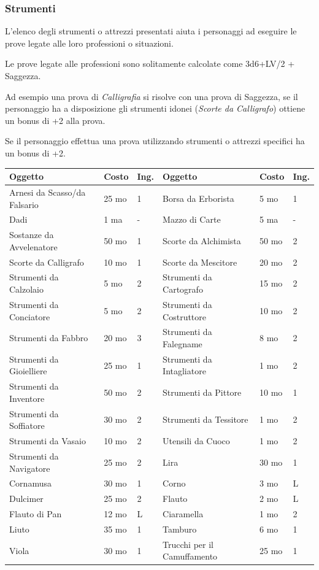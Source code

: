 \begin{multicols}{2}

\subsubsection{Strumenti}

L'elenco degli strumenti o attrezzi presentati aiuta i personaggi ad eseguire le prove legate alle loro professioni o situazioni.

Le prove legate alle professioni sono solitamente calcolate come 3d6+LV/2 + Saggezza.

Ad esempio una prova di \emph{Calligrafia} si risolve con una prova di Saggezza, se il personaggio ha a disposizione gli strumenti idonei (\emph{Scorte da Calligrafo}) ottiene un bonus di +2 alla prova.

Se il personaggio effettua una prova utilizzando strumenti o attrezzi specifici ha un bonus di +2.

\end{multicols}

\medskip

\noindent\begin{tabularx}{\linewidth}{llX|llX}
	\toprule
\textbf{Oggetto}&\textbf{Costo}&\textbf{Ing.}&\textbf{Oggetto}&\textbf{Costo}&\textbf{Ing.}\\
\toprule
Arnesi da Scasso/da Falsario&25 mo&1&Borsa da Erborista&5 mo&1\\
Dadi&1 ma&-&Mazzo di Carte&5 ma&-\\
Sostanze da Avvelenatore&50 mo&1&Scorte da Alchimista&50 mo&2\\
Scorte da Calligrafo&10 mo&1&Scorte da Mescitore&20 mo&2\\
Strumenti da Calzolaio&5 mo&2&Strumenti da Cartografo&15 mo&2\\
Strumenti da Conciatore&5 mo&2&Strumenti da Costruttore&10 mo&2\\
Strumenti da Fabbro&20 mo&3&Strumenti da Falegname&8 mo&2\\
Strumenti da Gioielliere&25 mo&1&Strumenti da Intagliatore&1 mo&2\\
Strumenti da Inventore&50 mo&2&Strumenti da Pittore&10 mo&1\\
Strumenti da Soffiatore&30 mo&2&Strumenti da Tessitore&1 mo&2\\
Strumenti da Vasaio&10 mo&2&Utensili da Cuoco&1 mo&2\\
Strumenti da Navigatore&25 mo&2&Lira&30 mo&1\\
Cornamusa&30 mo&1&Corno&3 mo&L\\
Dulcimer&25 mo&2&Flauto&2 mo&L\\
Flauto di Pan&12 mo&L&Ciaramella &1 mo &2\\
Liuto&35 mo&1&Tamburo&6 mo&1\\
Viola&30 mo&1&Trucchi per il Camuffamento&25 mo&1\\
\end{tabularx}

